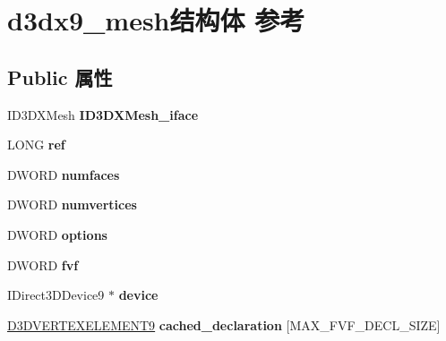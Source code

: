 \hypertarget{structd3dx9__mesh}{}\section{d3dx9\+\_\+mesh结构体 参考}
\label{structd3dx9__mesh}
\subsection*{Public 属性}
\begin{DoxyCompactItemize}
\item 
\mbox{\label{structd3dx9__mesh_ac0bb1eeaab48cf8de044164bbc6fc952}} 
I\+D3\+D\+X\+Mesh {\bfseries I\+D3\+D\+X\+Mesh\+\_\+iface}
\item 
\mbox{\label{structd3dx9__mesh_a641fc94e3990e9f3248db8768c0c7dac}} 
L\+O\+NG {\bfseries ref}
\item 
\mbox{\label{structd3dx9__mesh_a4366b0f8f34d5189f1f2cd2e2b88f07d}} 
D\+W\+O\+RD {\bfseries numfaces}
\item 
\mbox{\label{structd3dx9__mesh_a6a831dc8d803af0acd9e3de2b4350c88}} 
D\+W\+O\+RD {\bfseries numvertices}
\item 
\mbox{\label{structd3dx9__mesh_a9ab8c9b694c48b392634d1cecf37f476}} 
D\+W\+O\+RD {\bfseries options}
\item 
\mbox{\label{structd3dx9__mesh_a2e2f5f91495c7ac3de85da040433870b}} 
D\+W\+O\+RD {\bfseries fvf}
\item 
\mbox{\label{structd3dx9__mesh_a8743d2200900175b3d3ede2af1ea635c}} 
I\+Direct3\+D\+Device9 $\ast$ {\bfseries device}
\item 
\mbox{\label{structd3dx9__mesh_a48ccc13915f434b5ce16d4404467c325}} 
\hyperlink{struct___d3_d_v_e_r_t_e_x_e_l_e_m_e_n_t9}{D3\+D\+V\+E\+R\+T\+E\+X\+E\+L\+E\+M\+E\+N\+T9} {\bfseries cached\+\_\+declaration} \mbox{[}M\+A\+X\+\_\+\+F\+V\+F\+\_\+\+D\+E\+C\+L\+\_\+\+S\+I\+ZE\mbox{]}
\item 
\mbox{\label{structd3dx9__mesh_afcb547eb22f46ec18c0e5def75f44d51}} 

\end{DoxyCompactItemize}
